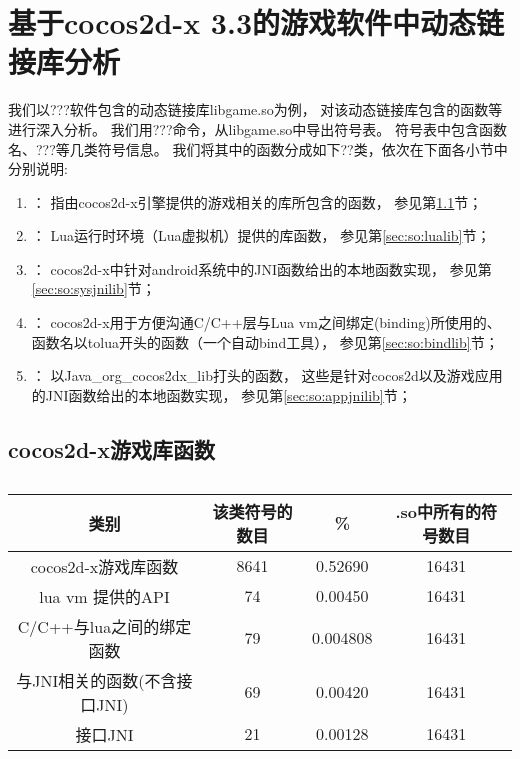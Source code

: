 \section{基于cocos2d-x 3.3的游戏软件中动态链接库分析}
我们以???软件包含的动态链接库libgame.so为例，
对该动态链接库包含的函数等进行深入分析。
我们用???命令，从libgame.so中导出符号表。
符号表中包含函数名、???等几类符号信息。
我们将其中的函数分成如下??类，依次在下面各小节中分别说明:
\begin{enumerate}
\item {}：
	指由cocos2d-x引擎提供的游戏相关的库所包含的函数，
	参见第\ref{sec:so:cocolib}节；
\item {}：
	Lua运行时环境（Lua虚拟机）提供的库函数，
	参见第\ref{sec:so:lualib}节；
\item {}：
	cocos2d-x中针对android系统中的JNI函数给出的本地函数实现，
	参见第\ref{sec:so:sysjnilib}节；
\item {}：
	cocos2d-x用于方便沟通C/C++层与Lua vm之间绑定(binding)所使用的、
	函数名以tolua开头的函数（一个自动bind工具），
	参见第\ref{sec:so:bindlib}节；
\item {}：
	以Java\_org\_cocos2dx\_lib打头的函数，
	这些是针对cocos2d以及游戏应用的JNI函数给出的本地函数实现，
	参见第\ref{sec:so:appjnilib}节；
\end{enumerate}

\subsection{cocos2d-x游戏库函数}
\label{sec:so:cocolib}

\begin{table}[H]
\caption{}
\begin{tabular}{|c|c|c|c|}
\hline 类别 & 该类符号的数目 & \% & .so中所有的符号数目\\
\hline cocos2d-x游戏库函数& 8641 & 0.52690 & 16431  \\
\hline  lua vm 提供的API & 74 & 0.00450 & 16431 \\
\hline C/C++与lua之间的绑定函数 & 79 &  0.004808 & 16431 \\
\hline 与JNI相关的函数(不含接口JNI) & 69 & 0.00420 & 16431 \\
\hline 接口JNI & 21 & 0.00128 & 16431 \\
\end{tabular}
\end{table}

